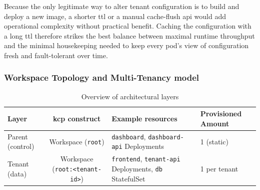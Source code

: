 \documentclass[11pt, a4paper, oneside, listof=totoc]{scrartcl}
\begin{document}
                Because the only legitimate way to alter tenant configuration is to build and deploy
                a new image, a shorter \gls{ttl} or a manual cache-flush \gls{api} would add
                operational complexity without practical benefit.
                Caching the configuration with a long \gls{ttl} therefore strikes the best balance
                between maximal runtime throughput and the minimal housekeeping needed to keep every
                pod's view of configuration fresh and fault-tolerant over time.

            \subsubsection{Workspace Topology and Multi-Tenancy model}\label{subsubsec:workspaceTopology}

                \begin{table}[H]\label{tab:layersOverview}
                    \centering
                    \renewcommand{\arraystretch}{1.5}
                    \begin{tabular}{lcp{4cm}P{8cm}}
                        \toprule
                        Layer & \gls{kcp} construct & Example resources & Provisioned Amount \\
                        \midrule
                        Parent (control) & Workspace (\texttt{root}) & \texttt{dashboard}, \texttt{dashboard-api} Deployments & 1 (static) \\
                        Tenant (data) & Workspace (\texttt{root:<tenant-id>}) & \texttt{frontend}, \texttt{tenant-api} Deployments, \texttt{\gls{db}} StatefulSet & 1 per tenant \\
                        \bottomrule
                    \end{tabular}
                    \caption{Overview of architectural layers}
                \end{table}
\end{document}
